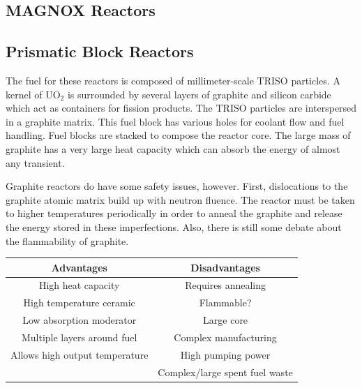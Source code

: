 \subsection{MAGNOX Reactors}

\subsection{Prismatic Block Reactors}
The fuel for these reactors is composed of millimeter-scale TRISO particles. A kernel of UO$_2$ is surrounded by several layers of graphite and silicon carbide which act as containers for fission products.
The TRISO particles are interspersed in a graphite matrix. This fuel block has various holes for coolant flow and fuel handling. Fuel blocks are stacked to compose the reactor core. 
The large mass of graphite has a very large heat capacity which can absorb the energy of almost any transient. 

Graphite reactors do have some safety issues, however. First, dislocations to the graphite atomic matrix build up with neutron fluence. The reactor must be taken to higher temperatures periodically in order to anneal the graphite and release the energy stored in these imperfections. %
Also, there is still some debate about the flammability of graphite.
\begin{table}[!h] \label{tab:Prismatic}
\begin{tabular}{c|c}
  Advantages & Disadvantages \\
  \hline
  High heat capacity & Requires annealing\\
  High temperature ceramic & Flammable?\\
  Low absorption moderator & Large core\\
  Multiple layers around fuel & Complex manufacturing\\
  Allows high output temperature & High pumping power\\
  & Complex/large spent fuel waste\\
\end{tabular}
\end{table}

